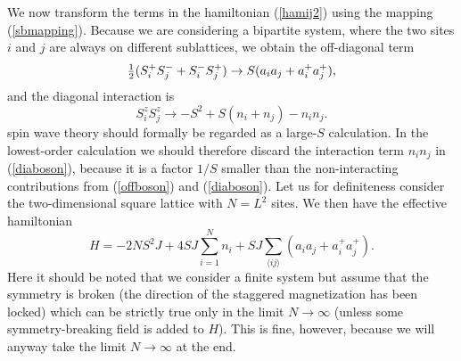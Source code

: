 \documentclass[draft,numberedheadings]{aipproc}
\newcommand{\half}{\hbox{$\frac{1}{2}$}}
\begin{document}
We now transform the terms in the hamiltonian (\ref{hamij2}) using the mapping (\ref{sbmapping}). Because we are considering a bipartite system, where the 
two sites $i$ and $j$ are always on different sublattices, we obtain the off-diagonal term
\begin{equation}
\half(S^+_iS^-_{j}+S^-_iS^+_{j}) \to S(a_ia_j + a^+_ia^+_j),
\label{offboson}
\end{equation}
and the diagonal interaction is
\begin{equation}
S^z_iS^z_j \to -S^2+S(n_i+n_j)-n_in_j.
\label{diaboson}
\end{equation}
spin wave theory should formally be regarded as a large-$S$ calculation. In the lowest-order calculation we should therefore discard the interaction 
term $n_in_j$ in (\ref{diaboson}), because it is a factor $1/S$ smaller than the non-interacting contributions from (\ref{offboson}) and (\ref{diaboson}). 
Let us for definiteness consider the two-dimensional square lattice with $N=L^2$ sites. We then have the effective hamiltonian
\begin{equation}
H = -2NS^2J+4SJ\sum_{i=1}^N n_i + SJ\sum_{\langle ij\rangle} (a_ia_j + a^+_ia^+_j).
\label{swham1}
\end{equation}
Here it should be noted that we consider a finite system but assume that the symmetry is broken (the direction of the staggered magnetization 
has been locked) which can be strictly true only in the limit $N\to \infty$ (unless some symmetry-breaking field is added to $H$). 
This is fine, however, because we will anyway take the limit $N\to \infty$ at the end.
\end{document}
